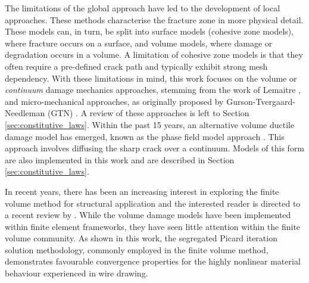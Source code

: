 \documentclass[sn-mathphys,Numbered]{sn-jnl}%
\begin{document}
The limitations of the global approach have led to the development of local approaches.
These methods characterise the fracture zone in more physical detail.
These models can, in turn, be split into surface models (cohesive zone models), where fracture occurs on a surface, and volume models, where damage or degradation occurs in a volume.
A limitation of cohesive zone models is that they often require a pre-defined crack path and typically exhibit strong mesh dependency.
With these limitations in mind, this work focuses on the volume or \emph{continuum} damage mechanics approaches, stemming from the work of Lemaitre \cite{lemaitre_continuous_1985, lemaitre_engineering_2005}, and micro-mechanical approaches, as originally proposed by Gurson-Tvergaard-Needleman (GTN) \cite{gurson_continuum_1977, tvergaard_analysis_1984}.
A review of these approaches is left to Section \ref{sec:constitutive_laws}.
Within the past 15 years, an alternative volume ductile damage model has emerged, known as the phase field model approach \cite{ambati_phase-field_2015, borden_phase-field_2016, miehe_phase_2016, dittmann_variational_2018, samaniego_phase-field_2021}. This approach involves diffusing the sharp crack over a continuum.
Models of this form are also implemented in this work and are described in Section \ref{sec:constitutive_laws}.


In recent years, there has been an increasing interest in exploring the finite volume method for structural application and the interested reader is directed to a recent review by \citet{cardiff_thirty_2021}.
While the volume damage models have been implemented within finite element frameworks, they have seen little attention within the finite volume community.
As shown in this work, the segregated Picard iteration solution methodology, commonly employed in the finite volume method, demonstrates favourable convergence properties for the highly nonlinear material behaviour experienced in wire drawing.
\end{document}
